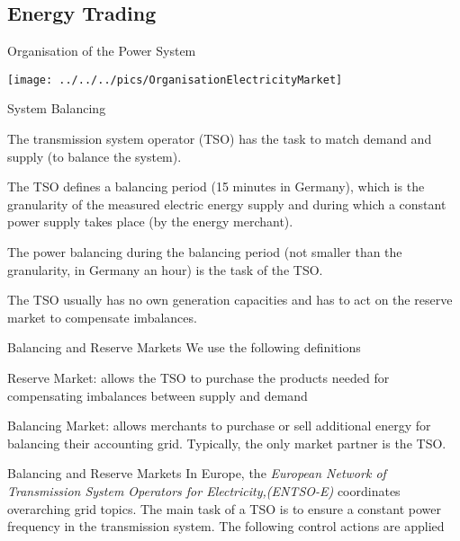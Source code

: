 
\subsection{Energy Trading}

{Organisation of the Power System}
\begin{center}
\texttt{[image: ../../../pics/OrganisationElectricityMarket]}
\end{center}

{System Balancing}






	The transmission system operator (TSO) has the task to match demand and supply (to balance the system).


	The TSO defines a balancing period (15 minutes in Germany), which is the granularity of the measured electric energy supply and during which a constant power supply takes place (by the energy merchant).


	The power balancing during the balancing period (not smaller than the granularity, in Germany an hour) is the task of the TSO.


	The TSO usually has no own generation capacities and has to act on the reserve market to compensate imbalances.





{Balancing and Reserve Markets}
We use the following definitions






	Reserve Market: allows the TSO to purchase the products needed for compensating imbalances between supply and demand


	Balancing Market: allows merchants to purchase or sell additional energy for balancing their accounting grid. Typically, the only market partner is the TSO.





{Balancing and Reserve Markets}
In Europe, the {\it European Network of Transmission System Operators for Electricity,(ENTSO-E)} coordinates overarching grid topics. The main task of a TSO is to ensure a constant power frequency in the transmission system. The following control actions are applied


